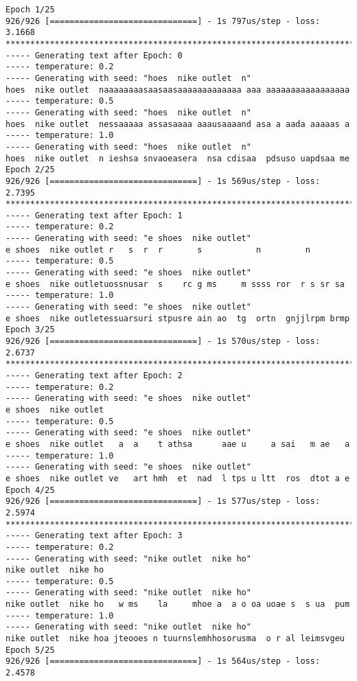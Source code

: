 \documentclass[11pt]{article}
\begin{document}
    \begin{Verbatim}[commandchars=\\\{\}]
Epoch 1/25
926/926 [==============================] - 1s 797us/step - loss: 3.1668
****************************************************************************
----- Generating text after Epoch: 0
----- temperature: 0.2
----- Generating with seed: "hoes  nike outlet  n"
hoes  nike outlet  naaaaaaaasaasaasaaaaaaaaaaaaa aaa aaaaaaaaaaaaaaaaa
----- temperature: 0.5
----- Generating with seed: "hoes  nike outlet  n"
hoes  nike outlet  nessaaaaa assasaaaa aaausaaaand asa a aada aaaaas a
----- temperature: 1.0
----- Generating with seed: "hoes  nike outlet  n"
hoes  nike outlet  n ieshsa snvaoeasera  nsa cdisaa  pdsuso uapdsaa me
Epoch 2/25
926/926 [==============================] - 1s 569us/step - loss: 2.7395
****************************************************************************
----- Generating text after Epoch: 1
----- temperature: 0.2
----- Generating with seed: "e shoes  nike outlet"
e shoes  nike outlet r   s  r  r       s           n         n
----- temperature: 0.5
----- Generating with seed: "e shoes  nike outlet"
e shoes  nike outletuossnusar  s    rc g ms     m ssss ror  r s sr sa
----- temperature: 1.0
----- Generating with seed: "e shoes  nike outlet"
e shoes  nike outletessuarsuri stpusre ain ao  tg  ortn  gnjjlrpm brmp
Epoch 3/25
926/926 [==============================] - 1s 570us/step - loss: 2.6737
****************************************************************************
----- Generating text after Epoch: 2
----- temperature: 0.2
----- Generating with seed: "e shoes  nike outlet"
e shoes  nike outlet
----- temperature: 0.5
----- Generating with seed: "e shoes  nike outlet"
e shoes  nike outlet   a  a    t athsa      aae u     a sai   m ae   a
----- temperature: 1.0
----- Generating with seed: "e shoes  nike outlet"
e shoes  nike outlet ve   art hmh  et  nad  l tps u ltt  ros  dtot a e
Epoch 4/25
926/926 [==============================] - 1s 577us/step - loss: 2.5974
****************************************************************************
----- Generating text after Epoch: 3
----- temperature: 0.2
----- Generating with seed: "nike outlet  nike ho"
nike outlet  nike ho
----- temperature: 0.5
----- Generating with seed: "nike outlet  nike ho"
nike outlet  nike ho   w ms    la     mhoe a  a o oa uoae s  s ua  pum
----- temperature: 1.0
----- Generating with seed: "nike outlet  nike ho"
nike outlet  nike hoa jteooes n tuurnslemhhosorusma  o r al leimsvgeu
Epoch 5/25
926/926 [==============================] - 1s 564us/step - loss: 2.4578

\end{Verbatim}
\end{document}
